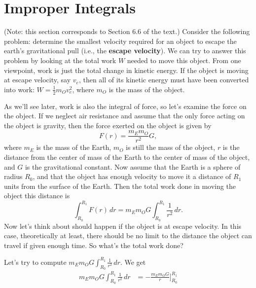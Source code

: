 \documentclass[10pt,]{book}
\newcommand{\terminology}[1]{\textbf{#1}}
\numberwithin{equation}{section}
\begin{document}
\section[{Improper Integrals}]{Improper Integrals}\label{section-improper-integrals}
\begin{introduction}{}%
\hypertarget{p-574}{}%
(Note: this section corresponds to Section 6.6 of the text.) Consider the following problem: determine the smallest velocity required for an object to escape the earth's gravitational pull (i.e., the \terminology{escape velocity}). We can try to answer this problem by looking at the total work \(W\) needed to move this object. From one viewpoint, work is just the total change in kinetic energy. If the object is moving at escape velocity, say \(v_{e}\), then all of its kinetic energy must have been converted into work: \(W = \frac{1}{2}m_{O}v_{e}^{2}\), where \(m_{O}\) is the mass of the object.%
\par
\hypertarget{p-575}{}%
As we'll see later, work is also the integral of force, so let's examine the force on the object. If we neglect air resistance and assume that the only force acting on the object is gravity, then the force exerted on the object is given by%
\begin{equation*}
F(r) = \frac{m_{E}m_{O}}{r^{2}}G,
\end{equation*}
where \(m_{E}\) is the mass of the Earth, \(m_{O}\) is still the mass of the object, \(r\) is the distance from the center of mass of the Earth to the center of mass of the object, and \(G\) is the gravitational constant. Now assume that the Earth is a sphere of radius \(R_{0}\), and that the object has enough velocity to move it a distance of \(R_{1}\) units from the surface of the Earth. Then the total work done in moving the object this distance is%
\begin{equation*}
\int_{R_{0}}^{R_{1}}F(r)\,dr = m_{E}m_{O}G\int_{R_{0}}^{R_{1}}\frac{1}{r^{2}}\,dr.
\end{equation*}
Now let's think about should happen if the object is at escape velocity. In this case, theoretically at least, there should be no limit to the distance the object can travel if given enough time. So what's the total work done?%
\par
\hypertarget{p-576}{}%
Let's try to compute \(m_{E}m_{O}G\int_{R_{0}}^{R_{1}}\frac{1}{r^{2}}\,dr.\) We get%
\begin{align*}
m_{E}m_{O}G\int_{R_{0}}^{R_{1}}\frac{1}{r^{2}}\,dr & = -\frac{m_{E}m_{O}G}{r}\big]_{R_{0}}^{R_{1}} \\

\end{align*}
\end{introduction}
\end{document}
